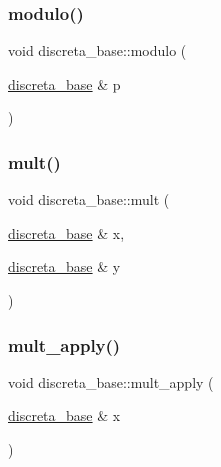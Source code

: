 \mbox{\label{classdiscreta__base_ac4ee015a4115c5f5851cb3da41c8eca0}} 
\subsubsection{\texorpdfstring{modulo()}{modulo()}}
{\footnotesize\ttfamily void discreta\+\_\+base\+::modulo (\begin{DoxyParamCaption}\item[{\mbox{\hyperlink{classdiscreta__base}{discreta\+\_\+base}} \&}]{p }\end{DoxyParamCaption})}

\mbox{\label{classdiscreta__base_a96f759b28f7c30bdfd95ac10f5972bd0}} 
\subsubsection{\texorpdfstring{mult()}{mult()}}
{\footnotesize\ttfamily void discreta\+\_\+base\+::mult (\begin{DoxyParamCaption}\item[{\mbox{\hyperlink{classdiscreta__base}{discreta\+\_\+base}} \&}]{x,  }\item[{\mbox{\hyperlink{classdiscreta__base}{discreta\+\_\+base}} \&}]{y }\end{DoxyParamCaption})}

\mbox{\label{classdiscreta__base_a301b8d0527d3a60ba410bba87446f490}} 
\subsubsection{\texorpdfstring{mult\+\_\+apply()}{mult\_apply()}}
{\footnotesize\ttfamily void discreta\+\_\+base\+::mult\+\_\+apply (\begin{DoxyParamCaption}\item[{\mbox{\hyperlink{classdiscreta__base}{discreta\+\_\+base}} \&}]{x }\end{DoxyParamCaption})}

